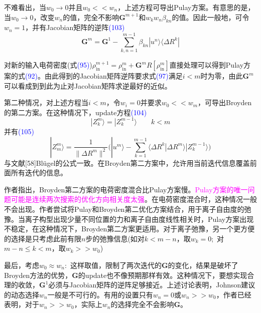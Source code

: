 \documentclass[14pt]{article}      %
\begin{document}
不难看出，当$w_0\rightarrow0$并且$w_0<<w_n$，上述方程可导出\textrm{Pulay}方案。有意思的是，当$w_0\rightarrow0$，改变$w_n$的值，完全不影响$\mathbf{G}^{m+1}$和$w_kw_n\beta_{kn}$的值。因此一般地，可令$w_n=1$，并有\textrm{Jacobian}矩阵的逆阵\textcolor{blue}{(103)}
\begin{displaymath}
	\mathbf{G}^m=\mathbf{G}^1-\sum_{k,n=1}^{m-1}\beta_{kn}|u^n\rangle\langle\Delta R^k|
\end{displaymath}

对新的输入电荷密度(式\textcolor{blue}{(95)})$\rho_{\mathrm{in}}^{m+1}=\rho_{\mathrm{in}}^m+\mathbf{G}^mR[\rho_{\mathrm{in}}^m]$直接处理可以得到\textrm{Pulay}方案的式\textcolor{blue}{(92)}。由此得到的\textrm{Jacobian}矩阵逆阵要求式\textcolor{blue}{(97)}满足$i<m$时为零，由此$\mathbf{G}^m$可以看成到到此为止对\textrm{Jacobian}矩阵求逆最好的近似。

第二种情况，对上述方程当$i<m$，令$w_i=0$并要求$w_0<<w_m$，可导出\textrm{Broyden}的第二方案。在这种情况下，\textrm{update}方程\textcolor{blue}{(104)}
\begin{displaymath}
	|Z_k^m\rangle=|Z_k^{m-1}\rangle\qquad k<m
\end{displaymath}
并有\textcolor{blue}{(105)}
\begin{displaymath}
	|Z_m^m\rangle=\dfrac1{\lVert\Delta R^m\lVert^2}\bigg(|u^m\rangle-\sum_{k=1}^{m-1}\langle\Delta R^k|\Delta R^m\rangle|Z_k^{m-1}\rangle\bigg)
\end{displaymath}
与文献[58]\textrm{Bl\"ugel}的公式一致。在\textrm{Broyden}第二方案中，允许用当前迭代信息覆盖前面所有迭代的信息。

作者指出，\textrm{Broyden}第二方案的电荷密度混合比\textrm{Pulay}方案慢。\textcolor{magenta}{\textrm{Pulay}方案的唯一问题可能是连续两次搜索的优化方向相关度太强}。在电荷密度混合时，这种情况一般不会出现。作者尝试将\textrm{Pulay}和\textrm{Broyden}第二优化方案结合，用于离子自由度的弛豫。当离子构型出现少量不同位置的力和离子自由度线性相关时，\textrm{Pulay}方案出现不稳定，在这种情况下，\textrm{Broyden}第二方案更适用。对于离子弛豫，另一个更方便的选择是只考虑此前有限$n$步的弛豫信息(如对$k<m-n$，取$w_k=0$;~对$m-n\leqslant k<m$，取$w_k>>w_0$)

最后，考虑$w_0\approx w_n$:~这样取值，限制了两次迭代的$\mathbf{G}$的变化，结果是破坏了\textrm{Broyden}方法的优势，$\mathbf{G}$的\textrm{update}也不像预期那样有效。这种情况下，要想实现合理的收敛，$\mathbf{G}^1$必须与\textrm{Jacobian}矩阵的逆阵足够接近。上述讨论表明，\textrm{Johnson}建议的动态选择$w_n$一般是不可行的。有用的设置只有$w_n=0$或$w_n>>w_0$，作者已经表明，对于$w_n>>w_0$，实际上$w_n$的选择完全不会影响$\mathbf{G}$。
\end{document}
